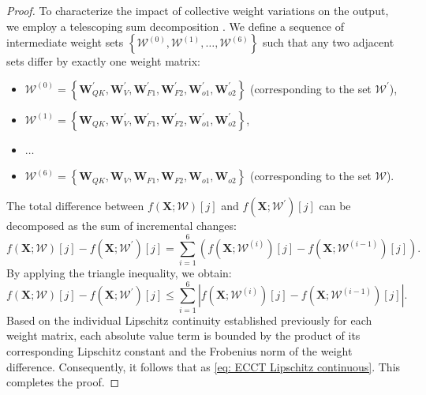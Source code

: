 \documentclass[lettersize,onecolumn]{IEEEtran}
\begin{document}
\begin{proof}
    To characterize the impact of collective weight variations on the output, we employ a telescoping sum decomposition \cite{thomson2008elementaryrealanalysis}. We define a sequence of intermediate weight sets $\left\{\mathcal{W}^{(0)}, \mathcal{W}^{(1)}, \ldots, \mathcal{W}^{(6)}\right\}$ such that any two adjacent sets differ by exactly one weight matrix:
    \begin{itemize}
        \item $\mathcal{W}^{(0)}=\left\{\mathbf{W}_{Q K}^{\prime}, \mathbf{W}_{V}^{\prime}, \mathbf{W}_{F 1}^{\prime}, \mathbf{W}_{F 2}^{\prime}, \mathbf{W}_{o 1}^{\prime}, \mathbf{W}_{o 2}^{\prime}\right\}$ (corresponding to the set $\mathcal{W}^{\prime}$),
        \item $\mathcal{W}^{(1)}=\left\{\mathbf{W}_{Q K}, \mathbf{W}_{V}^{\prime}, \mathbf{W}_{F 1}^{\prime}, \mathbf{W}_{F 2}^{\prime}, \mathbf{W}_{o 1}^{\prime}, \mathbf{W}_{o 2}^{\prime}\right\}$,
        \item $\ldots$
        \item $\mathcal{W}^{(6)}=\left\{\mathbf{W}_{Q K}, \mathbf{W}_{V}, \mathbf{W}_{F 1}, \mathbf{W}_{F 2}, \mathbf{W}_{o 1}, \mathbf{W}_{o 2}\right\}$ (corresponding to the set $\mathcal{W}$).
    \end{itemize}
    The total difference between $f(\mathbf{X};\mathcal{W})[j]$ and $f\left(\mathbf{X};\mathcal{W}^{\prime}\right)[j]$ can be decomposed as the sum of incremental changes:
    \begin{equation}
        f(\mathbf{X};\mathcal{W})[j]-f\left(\mathbf{X};\mathcal{W}^{\prime}\right)[j] = \sum_{i=1}^{6}\left(f(\mathbf{X};\mathcal{W}^{(i)})[j]-f(\mathbf{X};\mathcal{W}^{(i-1)})[j]\right).
    \end{equation}
    By applying the triangle inequality, we obtain:
    \begin{equation}
        f(\mathbf{X};\mathcal{W})[j]-f\left(\mathbf{X};\mathcal{W}^{\prime}\right)[j] \leq \sum_{i=1}^{6}\left|f(\mathbf{X};\mathcal{W}^{(i)})[j]-f(\mathbf{X};\mathcal{W}^{(i-1)})[j]\right|.
    \end{equation}
    Based on the individual Lipschitz continuity established previously for each weight matrix, each absolute value term is bounded by the product of its corresponding Lipschitz constant and the Frobenius norm of the weight difference. Consequently, it follows that as \eqref{eq: ECCT Lipschitz continuous}. This completes the proof.
\end{proof}
\end{document}
